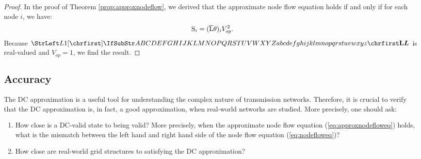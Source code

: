 \documentclass[main.tex]{subfiles}
\begin{document}
\begin{proof}
In the proof of Theorem \ref{prop:approxnodeflow}, we derived that the approximate node flow equation holds if and only if for each node $i$, we have:
\begin{align*}
    {\mathrm{S}}_i = (\overline{{\mathrm{L}}}{\mathrm{\theta}})_i V^2_{op}.
\end{align*}
Because $\mat{L}$ is real-valued and $V_{op}=1$, we find the result.
\end{proof}

\subsection{Accuracy}
The DC approximation is a useful tool for understanding the complex nature of transmission networks. Therefore, it is crucial to verify that the DC approximation is, in fact, a good approximation, when real-world networks are studied. More precisely, one should ask:
\begin{enumerate}
    \item How close is a DC-valid state to being valid? More precisely, when the approximate node flow equation (\ref{eq:approxnodefloweq}) holds, what is the mismatch between the left hand and right hand side of the node flow equation (\ref{eq:nodefloweq})?
    \item How close are real-world grid structures to satisfying the DC approximation?
\end{enumerate}
\end{document}
